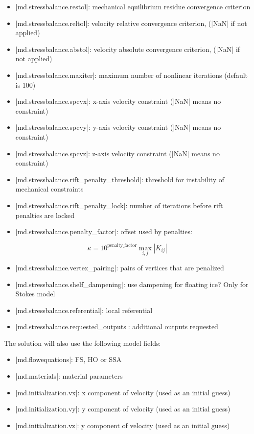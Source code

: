 \begin{itemize}
	\item \lstinlinebg|md.stressbalance.restol|: mechanical equilibrium residue convergence criterion
	\item \lstinlinebg|md.stressbalance.reltol|: velocity relative convergence criterion, (\lstinlinebg|NaN| if not applied)
	\item \lstinlinebg|md.stressbalance.abstol|: velocity absolute convergence criterion, (\lstinlinebg|NaN| if not applied)
	\item \lstinlinebg|md.stressbalance.maxiter|: maximum number of nonlinear iterations (default is 100)
	\item \lstinlinebg|md.stressbalance.spcvx|: x-axis velocity constraint (\lstinlinebg|NaN| means no constraint)
	\item \lstinlinebg|md.stressbalance.spcvy|: y-axis velocity constraint (\lstinlinebg|NaN| means no constraint)
	\item \lstinlinebg|md.stressbalance.spcvz|: z-axis velocity constraint (\lstinlinebg|NaN| means no constraint)
	\item \lstinlinebg|md.stressbalance.rift_penalty_threshold|: threshold for instability of mechanical constraints
	\item \lstinlinebg|md.stressbalance.rift_penalty_lock|: number of iterations before rift penalties are locked
	\item \lstinlinebg|md.stressbalance.penalty_factor|: offset used by penalties:
\end{itemize}
\begin{equation}
	\kappa=10^{\text{penalty\_factor}} \max_{i,j}\left| K_{ij}\right|
\end{equation}
\begin{itemize}
	\item \lstinlinebg|md.stressbalance.vertex_pairing|: pairs of vertices that are penalized
	\item \lstinlinebg|md.stressbalance.shelf_dampening|: use dampening for floating ice? Only for Stokes model
	\item \lstinlinebg|md.stressbalance.referential|: local referential
	\item \lstinlinebg|md.stressbalance.requested_outputs|: additional outputs requested
\end{itemize}

The solution will also use the following model fields:
\begin{itemize}
	\item \lstinlinebg|md.flowequations|: FS, HO or SSA
	\item \lstinlinebg|md.materials|: material parameters
	\item \lstinlinebg|md.initialization.vx|: x component of velocity (used as an initial guess)
	\item \lstinlinebg|md.initialization.vy|: y component of velocity (used as an initial guess)
	\item \lstinlinebg|md.initialization.vz|: y component of velocity (used as an initial guess)
\end{itemize}


